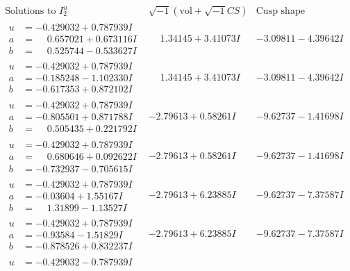 \documentclass[1p]{elsarticle_modified}
\theoremstyle{definition}
\newcommand{\I}{\sqrt{-1}}
\begin{document}
$$\begin{array}{c|c|c}  
\text{Solutions to }I^u_{2}& \I (\text{vol} + \sqrt{-1}CS) & \text{Cusp shape}\\
 \hline 
\begin{aligned}
u &= -0.429032 + 0.787939 I \\
a &= \phantom{-}0.657021 + 0.673116 I \\
b &= \phantom{-}0.525744 - 0.533627 I\end{aligned}
 & \phantom{-}1.34145 + 3.41073 I & -3.09811 - 4.39642 I \\ \hline\begin{aligned}
u &= -0.429032 + 0.787939 I \\
a &= -0.185248 - 1.102330 I \\
b &= -0.617353 + 0.872102 I\end{aligned}
 & \phantom{-}1.34145 + 3.41073 I & -3.09811 - 4.39642 I \\ \hline\begin{aligned}
u &= -0.429032 + 0.787939 I \\
a &= -0.805501 + 0.871788 I \\
b &= \phantom{-}0.505435 + 0.221792 I\end{aligned}
 & -2.79613 + 0.58261 I & -9.62737 - 1.41698 I \\ \hline\begin{aligned}
u &= -0.429032 + 0.787939 I \\
a &= \phantom{-}0.680646 + 0.092622 I \\
b &= -0.732937 - 0.705615 I\end{aligned}
 & -2.79613 + 0.58261 I & -9.62737 - 1.41698 I \\ \hline\begin{aligned}
u &= -0.429032 + 0.787939 I \\
a &= -0.03604 + 1.55167 I \\
b &= \phantom{-}1.31899 - 1.13527 I\end{aligned}
 & -2.79613 + 6.23885 I & -9.62737 - 7.37587 I \\ \hline\begin{aligned}
u &= -0.429032 + 0.787939 I \\
a &= -0.93584 - 1.51829 I \\
b &= -0.878526 + 0.832237 I\end{aligned}
 & -2.79613 + 6.23885 I & -9.62737 - 7.37587 I \\ \hline\begin{aligned}
u &= -0.429032 - 0.787939 I \\

\end{aligned}
\end{array}$$
\end{document}
